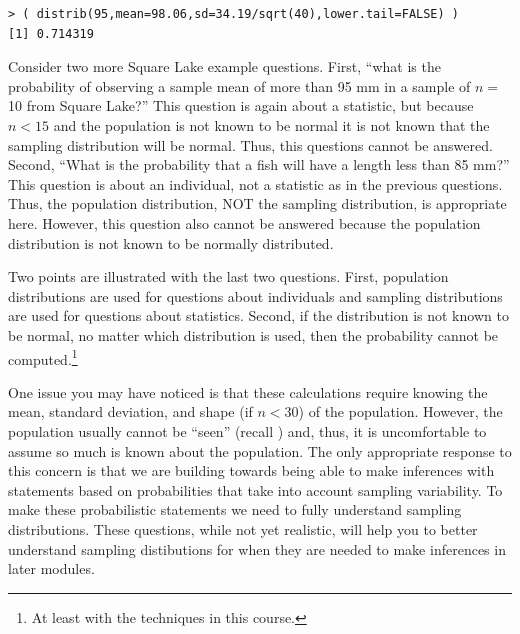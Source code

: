 \documentclass[10pt,openany]{book}\usepackage[]{graphicx}\usepackage[]{color}
\makeatletter
\newenvironment{kframe}{%
 \def\at@end@of@kframe{}%
 \ifinner\ifhmode%
  \def\at@end@of@kframe{\end{minipage}}%
  \begin{minipage}{\columnwidth}%
 \fi\fi%
 \def\FrameCommand##1{\hskip\@totalleftmargin \hskip-\fboxsep
 \colorbox{shadecolor}{##1}\hskip-\fboxsep
     \hskip-\linewidth \hskip-\@totalleftmargin \hskip\columnwidth}%
 \MakeFramed {\advance\hsize-\width
   \@totalleftmargin\z@ \linewidth\hsize
   \@setminipage}}%
 {\par\unskip\endMakeFramed%
 \at@end@of@kframe}
\newenvironment{knitrout}{}{} %
\makeatother
\begin{document}
\begin{knitrout}
\color{fgcolor}\begin{kframe}
\begin{verbatim}
> ( distrib(95,mean=98.06,sd=34.19/sqrt(40),lower.tail=FALSE) )
[1] 0.714319
\end{verbatim}
\end{kframe}
\end{knitrout}


Consider two more Square Lake example questions. First, ``what is the probability of observing a sample mean of more than 95 mm in a sample of $n=$10 from Square Lake?'' This question is again about a statistic, but because $n<15$ and the population is not known to be normal it is not known that the sampling distribution will be normal. Thus, this questions cannot be answered. Second, ``What is the probability that a fish will have a length less than 85 mm?''  This question is about an individual, not a statistic as in the previous questions. Thus, the population distribution, NOT the sampling distribution, is appropriate here. However, this question also cannot be answered because the population distribution is not known to be normally distributed.

Two points are illustrated with the last two questions. First, population distributions are used for questions about individuals and sampling distributions are used for questions about statistics. Second, if the distribution is not known to be normal, no matter which distribution is used, then the probability cannot be computed.\footnote{At least with the techniques in this course.}

One issue you may have noticed is that these calculations require knowing the mean, standard deviation, and shape (if $n<30$) of the population. However, the population usually cannot be ``seen'' (recall ) and, thus, it is uncomfortable to assume so much is known about the population. The only appropriate response to this concern is that we are building towards being able to make inferences with statements based on probabilities that take into account sampling variability. To make these probabilistic statements we need to fully understand sampling distributions. These questions, while not yet realistic, will help you to better understand sampling distibutions for when they are needed to make inferences in later modules.
\end{document}
